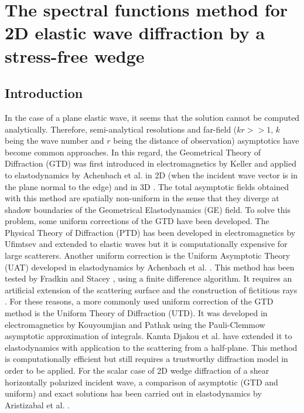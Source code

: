 \chapter[][2D Elastic Case]{The spectral functions method for 2D elastic wave diffraction by a stress-free wedge}
\label{chap-2D}

\section*{Introduction}

In the case of a plane elastic wave, it seems that the solution cannot be computed analytically. Therefore, semi-analytical resolutions and far-field ($kr>>1$, $k$ being the wave number and $r$ being the distance of observation) asymptotics have become common approaches. In this regard, the Geometrical Theory of Diffraction (GTD) was first introduced in electromagnetics by Keller \cite{GTD} and applied to elastodynamics by Achenbach et al. in 2D (when the incident wave vector is in the plane normal to the edge)  and in 3D \cite{Achenbach, AchenbachGautesen}. The total asymptotic fields obtained with this method are spatially non-uniform in the sense that they diverge at shadow boundaries of the Geometrical Elastodynamics (GE) field. To solve this problem, some uniform corrections of the GTD have been developed. The Physical Theory of Diffraction (PTD) has been developed in electromagnetics by Ufimtsev \cite{Ufmi} and extended to elastic waves \cite{Zernov,PTDdarmon} but it is computationally expensive for large scatterers. Another uniform correction is the Uniform Asymptotic Theory (UAT) developed in elastodynamics by Achenbach et al. \cite{Achenbach}. This method has been tested by Fradkin and Stacey \cite{Fradkinelliptic}, using a finite difference algorithm. It requires an artificial extension of the scattering surface and the construction of fictitious rays \cite{Bouche}. For these reasons, a more commonly used uniform correction of the GTD method is the Uniform Theory of Diffraction (UTD). It was developed in electromagnetics by Kouyoumjian and Pathak \cite{Kouyoumjian} using the Pauli-Clemmow \cite{Pauli} asymptotic approximation of integrals. Kamta Djakou et al. \cite{Audrey} have extended it to elastodynamics with application to the scattering from a half-plane. This method is computationally efficient but still requires a trustworthy diffraction model in order to be applied. For the scalar case of 2D wedge diffraction of a shear horizontally polarized incident wave, a comparison of asymptotic (GTD and uniform) and exact solutions has been carried out in elastodynamics by Aristizabal et al. \cite{Aristizabal}.

